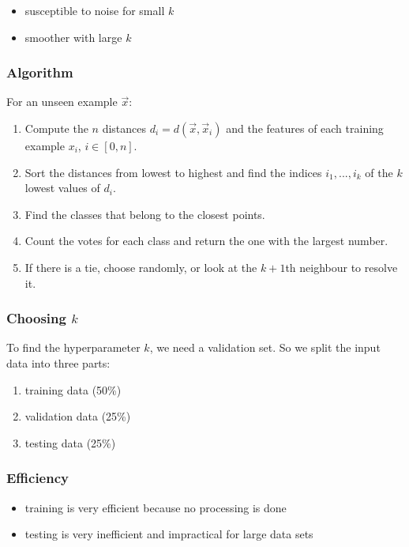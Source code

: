 \documentclass{article}
\begin{document}
\begin{itemize}
	\item susceptible to noise for small $k$
	\item smoother with large $k$
\end{itemize}

\subsubsection{Algorithm}

For an unseen example $\vec x$:
\begin{enumerate}
	\item Compute the $n$ distances $d_i=d(\vec x, \vec x_i)$ and the features
		  of each training example $x_i$, $i\in[0,n]$.
    \item Sort the distances from lowest to highest and find the indices $i_1,...,i_k$ of the $k$ lowest values of $d_i$.
    \item Find the classes that belong to the closest points.
    \item Count the votes for each class and return the one with the largest number.
    \item If there is a tie, choose randomly, or look at the $k+1$th neighbour to resolve it.
\end{enumerate}

\subsubsection{Choosing $k$}

To find the hyperparameter $k$, we need a validation set. So we split
the input data into three parts:
\begin{enumerate}
	\item training data (50\%)
	\item validation data (25\%)
	\item testing data (25\%)
\end{enumerate}

\subsubsection{Efficiency}
\begin{itemize}
	\item training is very efficient because no processing is done
	\item testing is very inefficient and impractical for large data sets
\end{itemize}
\end{document}
